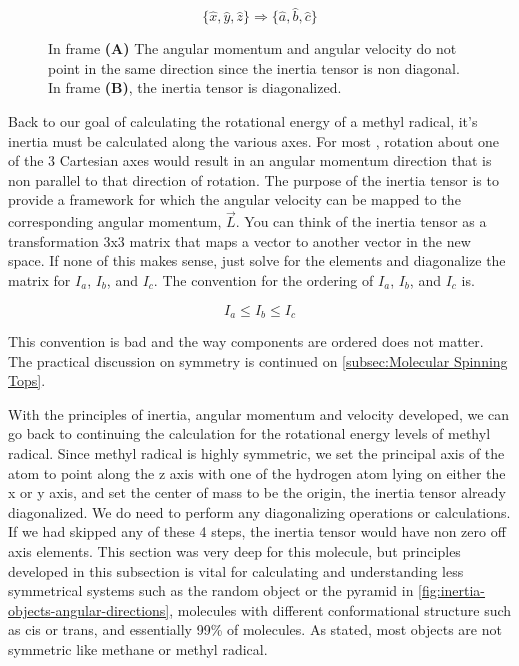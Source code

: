 \documentclass[11pt,a4paper]{book}
\newcommand{\imginput}[1]{} %
\begin{document}
			
			\begin{equation*}
				\{\hat{x}, \hat{y}, \hat{z}\} \Longrightarrow \{\hat{a}, \hat{b}, \hat{c}\}
			\end{equation*}
			

			
			\begin{figure} [!ht]
				\centering
				\large
				\def\svgwidth{\columnwidth}
				\resizebox{16cm}{!}{\imginput{images/inertia-angular-velocity-momentum.pdf_tex}}
				\caption{In frame \textbf{(A)} The angular momentum and angular velocity do not point in the same direction since the inertia tensor is non diagonal. In frame \textbf{(B)}, the inertia tensor is diagonalized.}
				\label{fig:inertia-angular-velocity-momentum}
			\end{figure}
			
			Back to our goal of calculating the rotational energy of a methyl radical, it's inertia must be calculated along the various axes. For most , rotation about one of the 3 Cartesian axes would result in an angular momentum direction that is non parallel to that direction of rotation. The purpose of the inertia tensor is to provide a framework for which the angular velocity can be mapped to the corresponding angular momentum, $\vec{L}$. You can think of the inertia tensor as a transformation 3x3 matrix that maps a vector to another vector in the new space. If none of this makes sense, just solve for the elements and diagonalize the matrix for $I_a$, $I_b$, and $I_c$. The convention for the ordering of $I_a$, $I_b$, and $I_c$ is.
			
			\begin{equation}
				I_a \leq I_b \leq I_c
			\end{equation}
			
			\noindent
			This convention is bad and the way components are ordered does not matter. The practical discussion on symmetry is continued on \autoref{subsec:Molecular Spinning Tops}.
			
			With the principles of inertia, angular momentum and velocity developed, we can go back to continuing the calculation for the rotational energy levels of methyl radical. Since methyl radical is highly symmetric, we set the principal axis of the atom to point along the z axis with one of the hydrogen atom lying on either the x or y axis, and set the center of mass to be the origin, the inertia tensor already diagonalized. We do need to perform any diagonalizing operations or calculations. If we had skipped any of these 4 steps, the inertia tensor would have non zero off axis elements. This section was very deep for this molecule, but principles developed in this subsection is vital for calculating and understanding less symmetrical systems such as the random object or the pyramid in \autoref{fig:inertia-objects-angular-directions}, molecules with different conformational structure such as cis or trans, and essentially 99\% of molecules. As stated, most objects are not symmetric like methane or methyl radical.
			
\end{document}
